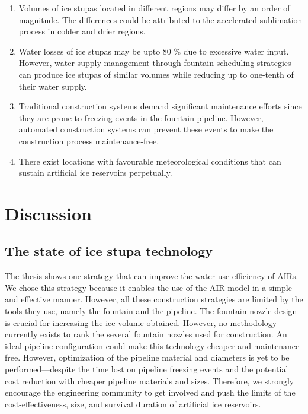 \begin{enumerate}

	\item Volumes of ice stupas located in different regions may differ by an order of magnitude. The differences
	      could be attributed to the accelerated sublimation process in colder and drier regions.

	\item Water losses of ice stupas may be upto 80 \% due to excessive water input. However, water supply
	      management through fountain scheduling strategies can produce ice stupas of similar volumes while reducing up to
	      one-tenth of their water supply.

	\item Traditional construction systems demand significant maintenance efforts since they are prone to freezing
	      events in the fountain pipeline. However, automated construction systems can prevent these events to make the
	      construction process maintenance-free.

	\item There exist locations with favourable meteorological conditions that can sustain artificial ice reservoirs
	      perpetually.

\end{enumerate}


\section{Discussion}

\subsection{The state of ice stupa technology}

The thesis shows one strategy that can improve the water-use efficiency of AIRs. We chose this strategy because
it enables the use of the AIR model in a simple and effective manner. However, all these construction strategies are
limited by the tools they use, namely the fountain and the pipeline. The fountain nozzle design is crucial for
increasing the ice volume obtained. However, no methodology currently exists to rank the several fountain
nozzles used for construction. An ideal pipeline configuration could make this technology cheaper and
maintenance free. However, optimization of the pipeline material and diameters is yet to be performed---despite
the time lost on pipeline freezing events and the potential cost reduction with cheaper pipeline materials and
sizes. Therefore, we strongly encourage the engineering community to get involved and push the limits of the
cost-effectiveness, size, and survival duration of artificial ice reservoirs.

